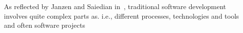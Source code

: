 As reflected by Janzen and Saiedian in~\cite{janzen2}, traditional software development involves quite complex parts as. i.e., different processes, technologies and tools and often software projects  	